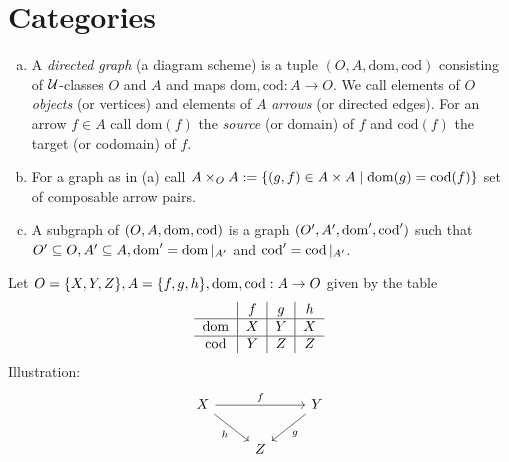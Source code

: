 \documentclass[a4paper]{report}
\begin{document}
\section{Categories}


\begin{defi}
\begin{enumerate}[(a)]
  \item A \emph{directed graph} (a diagram scheme) is a tuple $(O, A, \mathrm{dom}, \mathrm{cod})$ consisting of $\mathcal{U}$-classes $O$ and $A$ and maps $\mathrm{dom}, \mathrm{cod}: A \to O$. We call elements of $O$ \emph{objects} (or vertices) and elements of $A$ \emph{arrows} (or directed edges). For an arrow $f \in A$ call $\mathrm{dom}(f)$ the \emph{source} (or domain) of $f$ and $\mathrm{cod}(f)$ the target (or codomain) of $f$.
  \item For a graph as in (a) call $A \times_{O} A :=\{ (g,f) \in A \times A \mid \operatorname{dom}(g) = \operatorname{cod}(f)\}$ set of composable arrow pairs.
        \item A subgraph of $(O, A, \operatorname{dom}, \operatorname{cod})$ is a graph $(O', A', \operatorname{dom}', \operatorname{cod}')$ such that $O' \subseteq O, A' \subseteq A, \operatorname{dom} ' = \operatorname{dom}|_{A'}$ and $\operatorname{cod}' = \operatorname{cod}|_{A'}$.
\end{enumerate}

\end{defi}
\begin{exmp}
  Let $O = \{X, Y, Z\}, A = \{f, g, h\}, \operatorname{dom}, \operatorname{cod} : A \to O$ given by the table
  \[\begin{tabular}{ c|c|c|c }
     & $f$ & $g$ & $h$ \\
    \hline
    $\dom$ & $X$ & $Y$ & $X$ \\
    \hline
    $\cod$ & $Y$ & $Z$ & $Z$ \\
  \end{tabular}\]
Illustration:
\[\begin{tikzcd}
X \arrow[rr, "f"] \arrow[rd, "h"'] &   & Y \arrow[ld, "g"] \\
                                   & Z &
\end{tikzcd}\]
\end{exmp}
\end{document}
